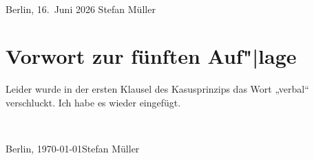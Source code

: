 

%

% 












~\medskip

\noindent
Berlin, 16.\ Juni 2026 \hfill Stefan Müller


\section*{Vorwort zur fünften Auf"|lage}

Leider wurde in der ersten Klausel des Kasusprinzips das Wort „verbal“ verschluckt. Ich habe es
wieder eingefügt.

~\medskip

\noindent
Berlin, \today\hfill Stefan Müller